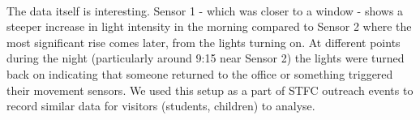 \paragraph{}
The data itself is interesting. Sensor 1 - which was closer to a window - shows a steeper increase in light intensity in the morning compared to Sensor 2 where the most significant rise comes later, from the lights turning on. At different points during the night (particularly around 9:15 near Sensor 2) the lights were turned back on indicating that someone returned to the office or something triggered their movement sensors. We used this setup as a part of STFC outreach events to record similar data for visitors (students, children) to analyse.

